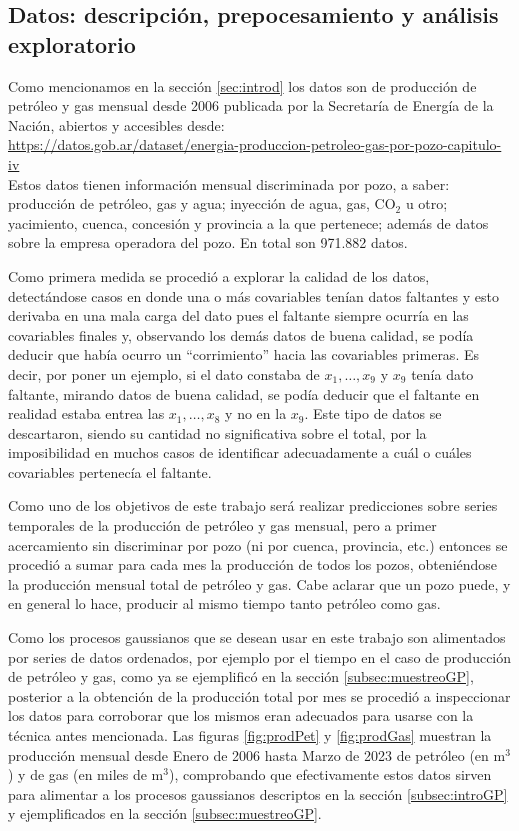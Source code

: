 \documentclass[a4paper]{article}
\begin{document}
\subsection{Datos: descripción, prepocesamiento y análisis exploratorio}
Como mencionamos en la sección \ref{sec:introd} los datos son de producción de petróleo y gas mensual desde 2006 publicada por la Secretaría de Energía de la Nación, abiertos y accesibles desde:\\

\url{https://datos.gob.ar/dataset/energia-produccion-petroleo-gas-por-pozo-capitulo-iv}\\

Estos datos tienen información mensual discriminada por pozo, a saber: producción de petróleo, gas y agua; inyección de agua, gas, CO$_2$ u otro; yacimiento, cuenca, concesión y provincia a la que pertenece; además de datos sobre la empresa operadora del pozo. En total son 971.882 datos.

Como primera medida se procedió a explorar la calidad de los datos, detectándose casos en donde una o más covariables tenían datos faltantes y esto derivaba en una mala carga del dato pues el faltante siempre ocurría en las covariables finales y, observando los demás datos de buena calidad, se podía deducir que había ocurro un ``corrimiento'' hacia las covariables primeras. Es decir, por poner un ejemplo, si el dato constaba de $x_1,\dots,x_9$ y $x_9$ tenía dato faltante, mirando datos de buena calidad, se podía deducir que el faltante en realidad estaba entrea las $x_1,\dots,x_8$ y no en la $x_9$. Este tipo de datos se descartaron, siendo su cantidad no significativa sobre el total, por la imposibilidad en muchos casos de identificar adecuadamente a cuál o cuáles covariables pertenecía el faltante.

Como uno de los objetivos de este trabajo será realizar predicciones sobre series temporales de la producción de petróleo y gas mensual, pero a primer acercamiento sin discriminar por pozo (ni por cuenca, provincia, etc.) entonces se procedió a sumar para cada mes la producción de todos los pozos, obteniéndose la producción mensual total de petróleo y gas. Cabe aclarar que un pozo puede, y en general lo hace, producir al mismo tiempo tanto petróleo como gas.

Como los procesos gaussianos que se desean usar en este trabajo son alimentados por series de datos ordenados, por ejemplo por el tiempo en el caso de producción de petróleo y gas, como ya se ejemplificó en la sección \ref{subsec:muestreoGP}, posterior a la obtención de la producción total por mes se procedió a inspeccionar los datos para corroborar que los mismos eran adecuados para usarse con la técnica antes mencionada. Las figuras \ref{fig:prodPet} y \ref{fig:prodGas} muestran la producción mensual desde Enero de 2006 hasta Marzo de 2023 de petróleo (en m$^3$) y de gas (en miles de m$^3$), comprobando que efectivamente estos datos sirven para alimentar a los procesos gaussianos descriptos en la sección \ref{subsec:introGP} y ejemplificados en la sección \ref{subsec:muestreoGP}.
\end{document}
